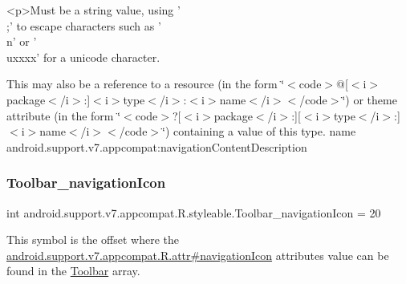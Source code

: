\begin{DoxyVerb}      <p>Must be a string value, using '\\;' to escape characters such as '\\n' or '\\uxxxx' for a unicode character.
\end{DoxyVerb}
 

This may also be a reference to a resource (in the form \char`\"{}$<$code$>$@\mbox{[}$<$i$>$package$<$/i$>$\+:\mbox{]}$<$i$>$type$<$/i$>$\+:$<$i$>$name$<$/i$>$$<$/code$>$\char`\"{}) or theme attribute (in the form \char`\"{}$<$code$>$?\mbox{[}$<$i$>$package$<$/i$>$\+:\mbox{]}\mbox{[}$<$i$>$type$<$/i$>$\+:\mbox{]}$<$i$>$name$<$/i$>$$<$/code$>$\char`\"{}) containing a value of this type.  name android.\+support.\+v7.\+appcompat\+:navigation\+Content\+Description \mbox{\label{classandroid_1_1support_1_1v7_1_1appcompat_1_1R_1_1styleable_ab88a1ca69cc3dbb4e5ffdadec5f6288a}} 
\subsubsection{\texorpdfstring{Toolbar\+\_\+navigation\+Icon}{Toolbar\_navigationIcon}}
{\footnotesize\ttfamily int android.\+support.\+v7.\+appcompat.\+R.\+styleable.\+Toolbar\+\_\+navigation\+Icon = 20\hspace{0.3cm}{\ttfamily [static]}}

This symbol is the offset where the \hyperlink{classandroid_1_1support_1_1v7_1_1appcompat_1_1R_1_1attr_a1f9dac21fa90b5d11e9f0e54b22a47ec}{android.\+support.\+v7.\+appcompat.\+R.\+attr\#navigation\+Icon} attribute\textquotesingle{}s value can be found in the \hyperlink{classandroid_1_1support_1_1v7_1_1appcompat_1_1R_1_1styleable_a2daba9587ef9f700f2d54cf13435cb32}{Toolbar} array.

